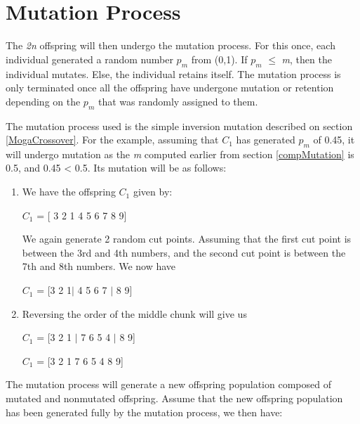 \section{Mutation Process}
\indent \indent The \emph{2n} offspring will then undergo the mutation process. For this once, each individual generated a random number \emph{$p_m$} from (0,1). If \emph{$p_m$} $\leq$ \emph{m}, then the individual mutates. Else, the individual retains itself. The mutation process is only terminated once all the offspring have undergone mutation or retention depending on the \emph{$p_m$} that was randomly assigned to them. \par 
The mutation process used is the simple inversion mutation described on section \ref{MogaCrossover}. For the example, assuming that $C_1$ has generated \emph{$p_m$} of 0.45, it will undergo mutation as the \emph{m} computed earlier from section \ref{compMutation} is 0.5, and 0.45 < 0.5. Its mutation will be as follows:

\begin{enumerate}
	\item We have the offspring $C_1$ given by:
	
	$C_{1}$ = [ 3 2 1 4 5 6 7 8 9] \par 
	
	\hfill \par 
	We again generate 2 random cut points. Assuming that the first cut point is between the 3rd and 4th numbers, and the second cut point is between the 7th and 8th numbers. We now have \par 
	\hfill \par 
	$C_{1}$ = [3 2 1$|$ 4 5 6 7 $|$ 8 9] \par 
	
	\hfill \par 
	
	\item Reversing the order of the middle chunk will give us \par 
	
	\hfill \par 
	
	$C_{1}$ = [3 2 1 $|$ 7 6 5 4 $|$ 8 9] \par 
	$C_{1}$ = [3 2 1 7 6 5 4 8 9]\par 
	
	\hfill \par 
\end{enumerate}

The mutation process will generate a new offspring population composed of mutated and nonmutated offspring. Assume that the new offspring population has been generated fully by the mutation process, we then have:


